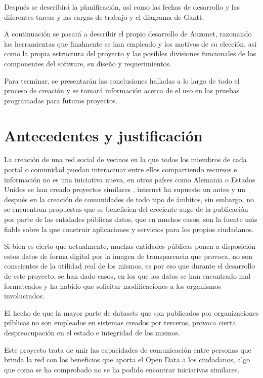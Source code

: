 \documentclass{DeustoFDP}
\begin{document}
Después se describirá la planificación, así como las fechas de desarrollo y las diferentes tareas y las cargas de trabajo y el diagrama de Gantt.

A continuación se pasará a describir el propio desarrollo de Auzonet, razonando las herramientas que finalmente se han empleado y los motivos de su elección, así como la propia estructura del proyecto y las posibles divisiones funcionales de los componentes del software, su diseño y requerimientos.


Para terminar, se presentarán las conclusiones halladas a lo largo de todo el proceso de creación y se tomará información acerca de el uso en las pruebas programadas para futuros proyectos.

\section{Antecedentes y justificación}\label{cha:antecedentesyjustificacion}
La creación de una red social de vecinos en la que todos los miembros de cada portal o comunidad puedan interactuar entre ellos compartiendo recursos e información no es una iniciativa nueva, en otros países como Alemania o Estados Unidos se han creado proyectos similares \cite{larazon}, internet ha supuesto un antes y un después en la creación de comunidades de todo tipo de ámbitos, sin embargo, no se encuentran propuestas que se beneficien del creciente auge de la publicación por parte de las entidades públicas datos, que en muchos casos, son la fuente más fiable sobre la que construir aplicaciones y servicios para los propios ciudadanos.

Si bien es cierto que actualmente, muchas entidades públicas ponen a disposición estos datos de forma digital por la imagen de transparencia que provoca, no son conscientes de la utilidad real de los mismos, es por eso que durante el desarrollo de este proyecto, se han dado casos, en los que los datos se han encontrado mal formateados y ha habido que solicitar modificaciones a los organismos involucrados.

El hecho de que la mayor parte de datasets que son publicados por organizaciones públicas no son empleados en sistemas creados por terceros, provoca cierta despreocupación en el estado e integridad de los mismos.

Este proyecto trata de unir las capacidades de comunicación entre personas que brinda la red con los beneficios que aporta el Open Data a los ciudadanos, algo que como se ha comprobado no se ha podido encontrar iniciativas similares.
\end{document}
